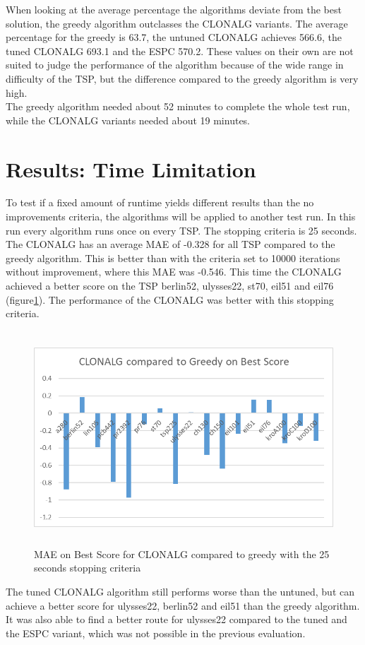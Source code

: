 When looking at the average percentage the algorithms deviate from the best solution, the greedy algorithm outclasses the CLONALG variants. The average percentage for the greedy is 63.7, the untuned CLONALG achieves 566.6, the tuned CLONALG 693.1 and the ESPC 570.2. These values on their own are not suited to judge the performance of the algorithm because of the wide range in difficulty of the TSP, but the difference compared to the greedy algorithm is very high.\\ The greedy algorithm needed about 52 minutes to complete the whole test run, while the CLONALG variants needed about 19 minutes.
\section{Results: Time Limitation}
To test if a fixed amount of runtime yields different results than the no improvements criteria, the algorithms will be applied to another test run. In this run every algorithm runs once on every TSP. The stopping criteria is 25 seconds.\\
The CLONALG has an average MAE of -0.328 for all TSP compared to the greedy algorithm. This is better than with the criteria set to 10000 iterations without improvement, where this MAE was -0.546. This time the CLONALG achieved a better score on the TSP berlin52, ulysses22, st70, eil51 and eil76 (figure\ref{CLONALG_Time}). The performance of the CLONALG was better with this stopping criteria.
\begin{figure}[H]
	\includegraphics[height=8cm,width=13cm]{Images/CLONALG_Time2.png}
	\caption{MAE on Best Score for CLONALG compared to greedy with the 25 seconds stopping criteria}
	\label{CLONALG_Time}
\end{figure}
The tuned CLONALG algorithm still performs worse than the untuned, but can achieve a better score for ulysses22, berlin52 and eil51 than the greedy algorithm. It was also able to find a better route for ulysses22 compared to the tuned and the ESPC variant, which was not possible in the previous evaluation.\\
